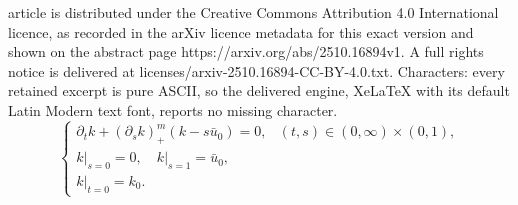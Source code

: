 \documentclass[10pt,a4paper]{amsart}
\newcommand{\p}{{\partial}}
\begin{document}
article is distributed under the Creative Commons Attribution 4.0 International licence, as recorded in the arXiv licence metadata for this exact version and shown on the abstract page https://arxiv.org/abs/2510.16894v1. A full rights notice is delivered at licenses/arxiv-2510.16894-CC-BY-4.0.txt. Characters: every retained excerpt is pure ASCII, so the delivered engine, XeLaTeX with its default Latin Modern text font, reports no missing character.
\begin{equation}\label{eq:primitive}
    \begin{cases}
    \p_t k + (\p_s k)^m_+ (k - s\bar u_0) = 0, & (t,s)\in (0,\infty)\times (0,1),\\
    k\vert_{s=0} = 0,\quad  
    k\vert_{s=1} = \bar u_0, \\
    k\vert_{t=0} = k_0.
\end{cases}    
\end{equation}
\end{document}
